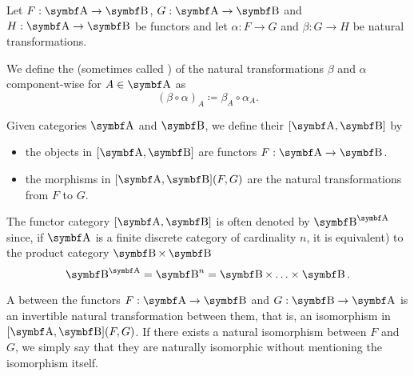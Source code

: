 \begin{definition}\label{def:natural_transformation_composition}
  Let \( F: \Cat{A} \to \Cat{B} \), \( G: \Cat{A} \to \Cat{B} \) and \( H: \Cat{A} \to \Cat{B} \) be functors and let \( \alpha: F \to G \) and \( \beta: G \to H \) be natural transformations.

  We define the  (sometimes called ) of the natural transformations \( \beta \) and \( \alpha \) component-wise for \( A \in \Cat{A} \) as
  \begin{equation*}
    (\beta \circ \alpha)_A \coloneqq \beta_{A} \circ \alpha_A.
  \end{equation*}
\end{definition}

\begin{definition}\label{def:functor_category}
  Given categories \( \Cat{A} \) and \( \Cat{B} \), we define their  \( [\Cat{A}, \Cat{B}] \) by
  \begin{itemize}
    \item the objects in \( [\Cat{A}, \Cat{B}] \) are functors \( F: \Cat{A} \to \Cat{B} \).
    \item the morphisms in \( [\Cat{A}, \Cat{B}](F, G) \) are the natural transformations from \( F \) to \( G \).
  \end{itemize}

  The functor category \( [\Cat{A}, \Cat{B}] \) is often denoted by \( {\Cat{B}}^{\Cat{A}} \) since, if \( \Cat{A} \) is a finite discrete category of cardinality \( n \), it is equivalent) to the product category \( \Cat{B} \times \Cat{B} \)
  \begin{equation*}
    {\Cat{B}}^{\Cat{A}} = {\Cat{B}}^n = \Cat{B} \times \ldots \times \Cat{B}.
  \end{equation*}
\end{definition}

\begin{definition}\label{def:natural_isomorpism}
  A  between the functors \( F: \Cat{A} \to \Cat{B} \) and \( G: \Cat{B} \to \Cat{A} \) is an invertible natural transformation between them, that is, an isomorphism in \( [\Cat{A}, \Cat{B}](F, G) \). If there exists a natural isomorphism between \( F \) and \( G \), we simply say that they are naturally isomorphic without mentioning the isomorphism itself.
\end{definition}

